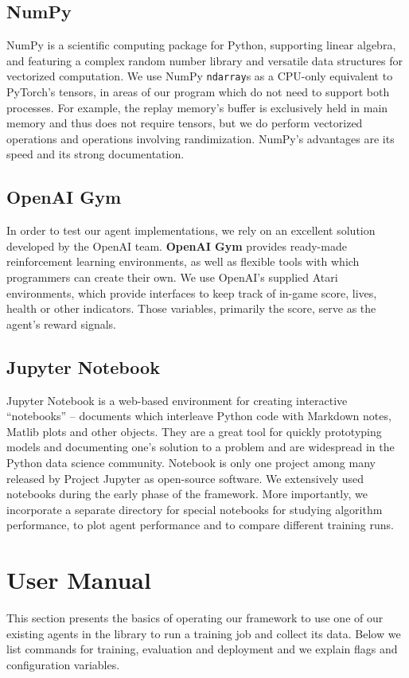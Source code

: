 \subsection*{NumPy}
NumPy is a scientific computing package for Python, supporting linear algebra, and featuring a complex random number library and versatile data structures for vectorized computation.
We use NumPy \verb|ndarray|s as a CPU-only equivalent to PyTorch's tensors, in areas of our program which do not need to support both processes.
For example, the replay memory's buffer is exclusively held in main memory and thus does not require tensors, but we do perform vectorized operations and operations involving randimization.
NumPy's advantages are its speed and its strong documentation.

\subsection*{OpenAI Gym}
In order to test our agent implementations, we rely on an excellent solution developed by the OpenAI team.
\textbf{OpenAI Gym} \cite{openai-gym} provides ready-made reinforcement learning environments, as well as flexible tools with which programmers can create their own.
We use OpenAI's supplied Atari environments, which provide interfaces to keep track of in-game score, lives, health or other indicators.
Those variables, primarily the score, serve as the agent's reward signals.

\subsection*{Jupyter Notebook}
Jupyter Notebook is a web-based environment for creating interactive ``notebooks'' -- documents which interleave Python code with Markdown notes, Matlib plots and other objects.
They are a great tool for quickly prototyping models and documenting one's solution to a problem and are widespread in the Python data science community.
Notebook is only one project among many released by Project Jupyter as open-source software.
We extensively used notebooks during the early phase of the framework.
More importantly, we incorporate a separate directory for special notebooks for studying algorithm performance, to plot agent performance and to compare different training runs.

\section{User Manual} \label{section:user-manual}
This section presents the basics of operating our framework to use one of our existing agents in the library to run a training job and collect its data.
Below we list commands for training, evaluation and deployment and we explain flags and configuration variables.

